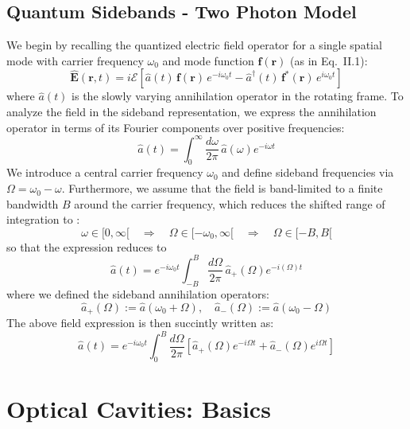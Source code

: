 \subsection{Quantum Sidebands - Two Photon Model }
We begin by recalling the quantized electric field operator for a single spatial mode with carrier frequency $\omega_0$ and mode function $\mathbf{f}(\mathbf{r})$ (as in Eq.~II.1):
\begin{equation}
\hat{\mathbf{E}}(\mathbf{r}, t) = i \mathcal{E} \left[ \hat{a}(t)\, \mathbf{f}(\mathbf{r})\, e^{-i \omega_0 t} - \hat{a}^\dagger(t)\, \mathbf{f}^*(\mathbf{r})\, e^{i \omega_0 t} \right]
\end{equation}
where $\hat{a}(t)$ is the slowly varying annihilation operator in the rotating frame.
To analyze the field in the sideband representation, we express the annihilation operator in terms of its Fourier components over positive frequencies:
\begin{equation}
\hat{a}(t) = \int_0^\infty \frac{d\omega}{2\pi} \, \hat{a}(\omega) e^{-i\omega t} 
\end{equation}
We introduce a central carrier frequency \( \omega_0 \) and define sideband frequencies via \( \Omega = \omega_0 - \omega \). Furthermore, we assume that the field is band-limited to a finite bandwidth \( B \) around the carrier frequency, which reduces the shifted range of integration to :
\[
\omega \in [0, \infty[ \quad \Rightarrow \quad \Omega \in [-\omega_0, \infty[ \quad \Rightarrow \quad \Omega \in [-B, B[
\]
so that the expression reduces to 
\begin{equation}
\hat{a}(t) 
= e^{-i \omega_0 t }\int_{-B}^{B} \frac{d\Omega}{2\pi} \, \hat{a}_+(\Omega)  e^{-i(\Omega)t}
\end{equation}
where we defined the sideband annihilation operators:
\begin{equation}
\hat{a}_+(\Omega) := \hat{a}(\omega_0 + \Omega), \quad
\hat{a}_-(\Omega) := \hat{a}(\omega_0 - \Omega)
\end{equation}
The above field expression is then succintly written as: 
\begin{equation}
  \hat{a}(t) = e^{-i \omega_0 t }\int_{0}^{B} \frac{d\Omega}{2\pi} \left[ \hat{a}_+(\Omega) e^{-i\Omega t} + \hat{a}_-(\Omega) e^{i\Omega t} \right]
\end{equation}


\section{Optical Cavities: Basics}
